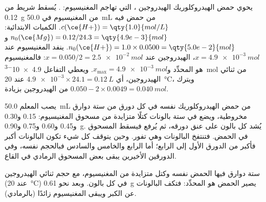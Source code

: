 \begin{example}\label{ex:g10:reaction-progress-table:magnesium}
يحوي حمض الهيدروكلوريك  الهيدروجين ، التي تهاجم المغنيسيوم:
. يُسقط شريط من \qty{0.12}{g} من المغنيسيوم
في \qty{50.0}{mL} من حمض فيه $c(\ce{H+}) = \qty{1.0}{mol/L}$.
الكميات الابتدائية: $n_0(\ce{Mg}) = 0.12/24.3 = \qty{4.9e-3}{mol}$
و$n_0(\ce{H+}) = 1.0 \times 0.0500 = \qty{5.0e-2}{mol}$. ينفد المغنيسيوم
عند $x = \qty{4.9e-3}{mol}$،  الهيدروجين عند
$x = 0.050/2 = \qty{2.5e-2}{mol}$: فالمغنيسيوم هو المحدِّد
و$x_{\max} = \qty{4.9e-3}{mol}$. ويعطي التفاعل \qty{4.9e-3}{mol} من
ثنائي الهيدروجين، أي $\num{4.9e-3} \times 24.1 = \qty{0.12}{L}$ عند
\qty{20}{\celsius}، ويترك $0.050 - 2 \times 0.0049 =
\qty{0.040}{mol}$ من  الهيدروجين بزيادة.
\end{example}

\begin{inthelab}
يصب المعلم \qty{50.0}{mL} من حمض الهيدروكلوريك نفسه في كل دورق من ستة دوارق
مخروطية، ويضع في ستة بالونات كتلًا متزايدة من مسحوق المغنيسيوم: 0.15 و0.30
و0.45 و0.60 و0.75 و\qty{0.90}{g}. يُشد كل بالون على عنق دورقه، ثم يُرفع
فيسقط المسحوق في الحمض. فتنتفخ البالونات وهي تفور. وحين يتوقف كل شيء تكون
البالونات أكبر فأكبر من الدورق الأول إلى الرابع؛ أما الرابع والخامس والسادس
فبالحجم نفسه، وفي الدورقين الأخيرين يبقى بعض المسحوق الرمادي في
القاع.
\end{inthelab}

\begin{omfigure}

{\small ستة دوارق فيها الحمض نفسه وكتل متزايدة من المغنيسيوم، مع حجم ثنائي
الهيدروجين (عند \qty{20}{\celsius}) في كل بالون. وبعد نحو \qty{0.61}{g}
يصير الحمض هو المحدِّد: فتكف البالونات عن الكبر ويبقى المغنيسيوم زائدًا
(بالرمادي).}
\end{omfigure}


